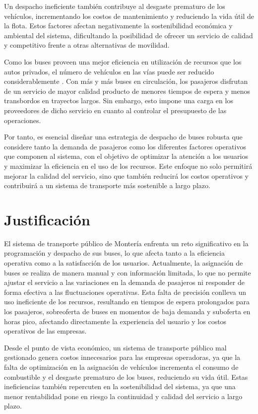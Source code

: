 \documentclass[preprint,11pt]{elsarticle}
\begin{document}
Un despacho ineficiente también contribuye al desgaste prematuro de los vehículos, incrementando los costos de mantenimiento y reduciendo la vida útil de la flota. Estos factores afectan negativamente la sostenibilidad económica y ambiental del sistema, dificultando la posibilidad de ofrecer un servicio de calidad y competitivo frente a otras alternativas de movilidad.

Como los buses proveen una mejor eficiencia en utilización de recursos que los autos privados, el número de vehículos en las vías puede ser reducido considerablemente \cite{wang2017}. Con más y más buses en circulación, los pasajeros disfrutan de un servicio de mayor calidad producto de menores tiempos de espera y menos transbordos en trayectos largos. Sin embargo, esto impone una carga en los proveedores de dicho servicio en cuanto al controlar el presupuesto de las operaciones. 

Por tanto, es esencial diseñar una estrategia de despacho de buses robusta que considere tanto la demanda de pasajeros como los diferentes factores operativos que componen al sistema, con el objetivo de optimizar la atención a los usuarios y maximizar la eficiencia en el uso de los recursos. Este enfoque no solo permitirá mejorar la calidad del servicio, sino que también reducirá los costos operativos y contribuirá a un sistema de transporte más sostenible a largo plazo.

\section{Justificación}

El sistema de transporte público de Montería enfrenta un reto significativo en la programación y despacho de sus buses, lo que afecta tanto a la eficiencia operativa como a la satisfacción de los usuarios. Actualmente, la asignación de buses se realiza de manera manual y con información limitada, lo que no permite ajustar el servicio a las variaciones en la demanda de pasajeros ni responder de forma efectiva a las fluctuaciones operativas. Esta falta de precisión conlleva un uso ineficiente de los recursos, resultando en tiempos de espera prolongados para los pasajeros, sobreoferta de buses en momentos de baja demanda y suboferta en horas pico, afectando directamente la experiencia del usuario y los costos operativos de las empresas.

Desde el punto de vista económico, un sistema de transporte público mal gestionado genera costos innecesarios para las empresas operadoras, ya que la falta de optimización en la asignación de vehículos incrementa el consumo de combustible y el desgaste prematuro de los buses, reduciendo su vida útil. Estas ineficiencias también repercuten en la sostenibilidad del sistema, ya que una menor rentabilidad pone en riesgo la continuidad y calidad del servicio a largo plazo.
\end{document}
